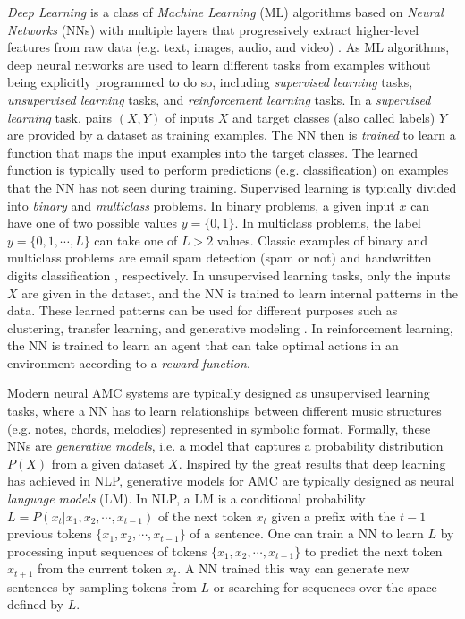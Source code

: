 \textit{Deep Learning} is a class of \textit{Machine Learning} (ML) algorithms based on \textit{Neural Networks} (NNs) with multiple layers that progressively extract higher-level features from raw data (e.g. text, images, audio, and video) \cite{goodfellow2016deep}. As ML algorithms, deep neural networks are used to learn different tasks from examples without being explicitly programmed to do so, including \textit{supervised learning} tasks, \textit{unsupervised learning} tasks, and \textit{reinforcement learning} tasks. In a \textit{supervised learning} task, pairs $(X,Y)$ of inputs $X$ and target classes (also called labels) $Y$ are provided by a dataset as training examples. The NN then is \textit{trained} to learn a function that maps the input examples into the target classes. The learned function is typically used to perform predictions (e.g. classification) on examples that the NN has not seen during training. Supervised learning is typically divided into \textit{binary} and \textit{multiclass} problems. In binary problems, a given input $x$ can have one of two possible values $y = \{0, 1\}$. In multiclass problems, the label $y = \{0, 1, \cdots, L\}$ can take one of $L > 2$ values. Classic examples of binary and multiclass problems are email spam detection (spam or not) and handwritten digits classification \cite{lecun1998gradient}, respectively. In unsupervised learning tasks, only the inputs $X$ are given in the dataset, and the NN is trained to learn internal patterns in the data. These learned patterns can be used for different purposes such as clustering, transfer learning, and generative modeling \cite{bengio2012unsupervised}. In reinforcement learning, the NN is trained to learn an agent that can take optimal actions in an environment according to a \textit{reward function}.

Modern neural AMC systems are typically designed as unsupervised learning tasks, where a NN has to learn relationships between different music structures (e.g. notes, chords, melodies) represented in symbolic format. Formally, these NNs are \textit{generative models}, i.e. a model that captures a probability distribution $P(X)$ from a given dataset $X$. Inspired by the great results that deep learning has achieved in NLP, generative models for AMC are typically designed as neural \textit{language models} (LM). In NLP, a LM is a conditional probability $L = P(x_t|x_1, x_2, \cdots, x_{t-1})$ of the next token $x_t$ given a prefix with the $t-1$ previous tokens $\{x_1, x_2, \cdots, x_{t-1}\}$ of a sentence. One can train a NN to learn $L$ by processing input sequences of tokens $\{x_1, x_2, \cdots, x_{t-1}\}$ to predict the next token $x_{t+1}$ from the current token $x_t$. A NN trained this way can generate new sentences by sampling tokens from $L$ or searching for sequences over the space defined by $L$.

